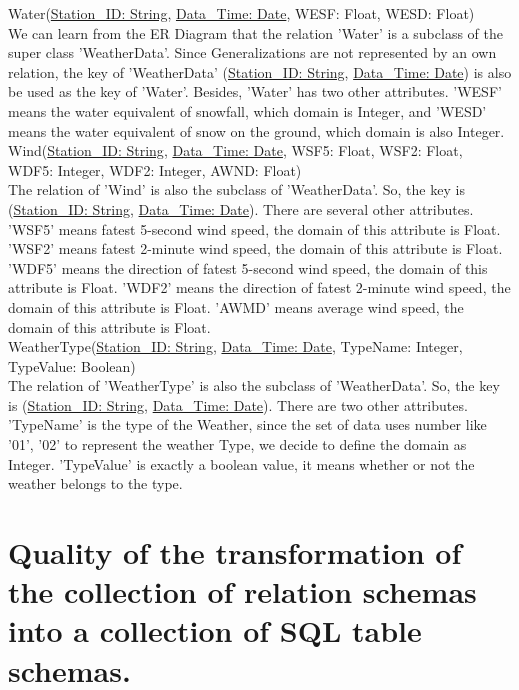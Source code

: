 \documentclass[]{article}
\begin{document}
	\noindent Water(\uline{Station\_ID: String}, \uline{Data\_Time: Date}, WESF: Float, WESD: Float)\\
	
	\noindent We can learn from the ER Diagram that the relation 'Water' is a subclass of the super class 'WeatherData'. Since Generalizations are not represented by an own relation, the key of 'WeatherData' (\uline{Station\_ID: String}, \uline{Data\_Time: Date}) is also be used as the key of 'Water'. Besides, 'Water' has two other attributes. 'WESF' means the water equivalent of snowfall, which domain is Integer, and 'WESD' means the water equivalent of snow on the ground, which domain is also Integer. \\
	
	\noindent Wind(\uline{Station\_ID: String}, \uline{Data\_Time: Date}, WSF5: Float, WSF2: Float, WDF5: Integer, WDF2: Integer, AWND: Float)\\
	
	\noindent The relation of 'Wind' is also the subclass of 'WeatherData'. So, the key is (\uline{Station\_ID: String}, \uline{Data\_Time: Date}). There are several other attributes. 'WSF5' means fatest 5-second wind speed, the domain of this attribute is Float. 'WSF2' means fatest 2-minute wind speed, the domain of this attribute is Float. 'WDF5' means the direction of fatest 5-second wind speed, the domain of this attribute is Float. 'WDF2' means the direction of fatest 2-minute wind speed, the domain of this attribute is Float. 'AWMD' means average wind speed, the domain of this attribute is Float.  \\
	
	\noindent WeatherType(\uline{Station\_ID: String}, \uline{Data\_Time: Date}, TypeName: Integer, TypeValue: Boolean)\\
	
	\noindent The relation of 'WeatherType' is also the subclass of 'WeatherData'. So, the key is (\uline{Station\_ID: String}, \uline{Data\_Time: Date}). There are two other attributes. 'TypeName' is the type of the Weather, since the set of data uses number like '01', '02' to represent the weather Type, we decide to define the domain as Integer. 'TypeValue' is exactly a boolean value, it means whether or not the weather belongs to the type.  \\
	
	\clearpage
	
	\section{Quality of the transformation of the collection of relation schemas into a collection of SQL table schemas.}
	
\end{document}
